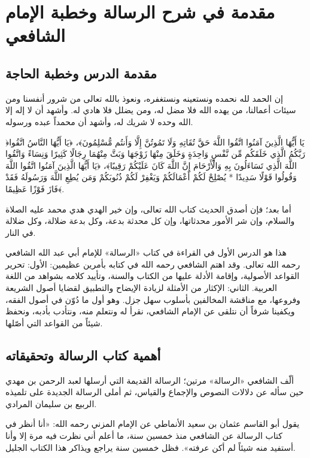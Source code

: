 \chapter{مقدمة في شرح الرسالة وخطبة الإمام الشافعي}

\section{مقدمة الدرس وخطبة الحاجة}
إن الحمد لله نحمده ونستعينه ونستغفره، ونعوذ بالله تعالى من شرور أنفسنا ومن سيئات أعمالنا، من يهده الله فلا مضل له، ومن يضلل فلا هادي له. وأشهد أن لا إله إلا الله وحده لا شريك له، وأشهد أن محمداً عبده ورسوله.

﴿يَا أَيُّهَا الَّذِينَ آمَنُوا اتَّقُوا اللَّهَ حَقَّ تُقَاتِهِ وَلَا تَمُوتُنَّ إِلَّا وَأَنتُم مُّسْلِمُونَ﴾، ﴿يَا أَيُّهَا النَّاسُ اتَّقُوا رَبَّكُمُ الَّذِي خَلَقَكُم مِّن نَّفْسٍ وَاحِدَةٍ وَخَلَقَ مِنْهَا زَوْجَهَا وَبَثَّ مِنْهُمَا رِجَالًا كَثِيرًا وَنِسَاءً وَاتَّقُوا اللَّهَ الَّذِي تَسَاءَلُونَ بِهِ وَالْأَرْحَامَ إِنَّ اللَّهَ كَانَ عَلَيْكُمْ رَقِيبًا﴾، ﴿يَا أَيُّهَا الَّذِينَ آمَنُوا اتَّقُوا اللَّهَ وَقُولُوا قَوْلًا سَدِيدًا * يُصْلِحْ لَكُمْ أَعْمَالَكُمْ وَيَغْفِرْ لَكُمْ ذُنُوبَكُمْ وَمَن يُطِعِ اللَّهَ وَرَسُولَهُ فَقَدْ فَازَ فَوْزًا عَظِيمًا﴾.

أما بعد؛ فإن أصدق الحديث كتاب الله تعالى، وإن خير الهدي هدي محمد عليه الصلاة والسلام، وإن شر الأمور محدثاتها، وإن كل محدثة بدعة، وكل بدعة ضلالة، وكل ضلالة في النار.

هذا هو الدرس الأول في القراءة في كتاب «الرسالة» للإمام أبي عبد الله الشافعي رحمه الله تعالى. وقد اهتم الشافعي رحمه الله في كتابه بأمرين عظيمين: الأول: تحرير القواعد الأصولية، وإقامة الأدلة عليها من الكتاب والسنة، وتأييد كلامه بشواهد من اللغة العربية. الثاني: الإكثار من الأمثلة لزيادة الإيضاح والتطبيق لقضايا أصول الشريعة وفروعها، مع مناقشة المخالفين بأسلوب سهل جزل. وهو أول ما دُوّن في أصول الفقه، ويكفينا شرفاً أن نتلقى عن الإمام الشافعي، نقرأ له ونتعلم منه، ونتأدب بأدبه، ونحفظ شيئاً من القواعد التي أصّلها.

\section{أهمية كتاب الرسالة وتحقيقاته}
ألّف الشافعي «الرسالة» مرتين؛ الرسالة القديمة التي أرسلها لعبد الرحمن بن مهدي حين سأله عن دلالات النصوص والإجماع والقياس، ثم أملى الرسالة الجديدة على تلميذه الربيع بن سليمان المرادي.

يقول أبو القاسم عثمان بن سعيد الأنماطي عن الإمام المزني رحمه الله: «أنا أنظر في كتاب الرسالة عن الشافعي منذ خمسين سنة، ما أعلم أني نظرت فيه مرة إلا وأنا أستفيد منه شيئاً لم أكن عرفته». فظل خمسين سنة يراجع ويذاكر هذا الكتاب الجليل.

